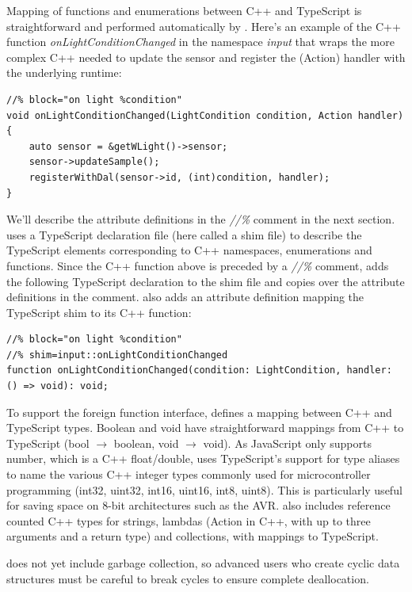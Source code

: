 Mapping of functions and enumerations between C++ and TypeScript is straightforward
and performed automatically by \MC. 
Here's an example of the C++ function \emph{onLightConditionChanged} 
in the namespace \emph{input} that 
wraps the more complex C++ needed to update the sensor and register the (Action) 
handler with the underlying \CO runtime:
\begin{lstlisting}
//% block="on light %condition"
void onLightConditionChanged(LightCondition condition, Action handler) {
    auto sensor = &getWLight()->sensor;
    sensor->updateSample();
    registerWithDal(sensor->id, (int)condition, handler);
}
\end{lstlisting}

We'll describe the attribute definitions in the \emph{//\%} comment in the next section. 
\MC uses a TypeScript declaration file (here called a shim file) to describe the TypeScript 
elements corresponding to C++ namespaces, enumerations and functions.
Since the C++ function above is preceded by a \emph{//\%} comment, 
\MC adds the following TypeScript declaration to the shim file and copies
over the attribute definitions in the comment. \MC also adds an attribute definition mapping
the TypeScript shim to its C++ function:

\begin{lstlisting}
//% block="on light %condition"
//% shim=input::onLightConditionChanged
function onLightConditionChanged(condition: LightCondition, handler: () => void): void;
\end{lstlisting}

To support the foreign function interface, \MC defines a mapping between C++ and TypeScript types.
Boolean and void have straightforward mappings from C++ to TypeScript (bool $\rightarrow$ boolean, void $\rightarrow$ void). 
As JavaScript only supports number, which is a C++ float/double, \MC uses TypeScript's support
for type aliases to name the various C++ integer types commonly used for microcontroller programming
(int32, uint32, int16, uint16, int8, uint8). 
This is particularly useful for saving space on 8-bit architectures such as the AVR. 
\MC also includes reference counted C++ types for strings, lambdas (Action in C++, with
up to three arguments and a return type) and collections, with mappings to TypeScript.

\MC does not yet include garbage collection, so advanced users who create cyclic
data structures must be careful to break cycles to ensure complete deallocation.

